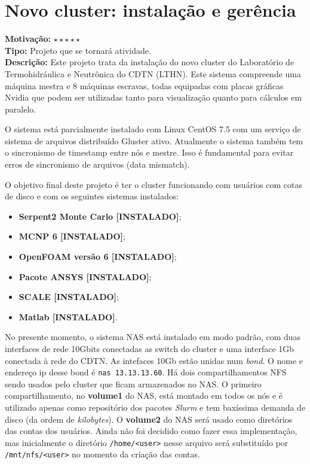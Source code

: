 \chapter{Novo cluster: instalação e gerência}
\label{chap:cluster}

\textbf{Motivação:} $\star\star\star\star\star$\\

\textbf{Tipo:} Projeto que se tornará atividade.\\

\textbf{Descrição:} Este projeto trata da instalação do novo cluster do Laboratório 
de Termohidráulica e Neutrônica do CDTN (LTHN). Este sistema compreende uma máquina mestra e 8 máquinas escravas, todas equipadas com placas gráficas Nvidia que podem ser utilizadas tanto para visualização quanto para cálculos em paralelo.

O sistema está parcialmente instalado com Linux CentOS 7.5 com um serviço de 
sistema de arquivos distribuído Gluster ativo. Atualmente o sistema também tem 
o sincronismo de timestamp entre nós e mestre. Isso é fundamental para evitar 
erros de sincronismo de arquivos (data mismatch).

O objetivo final deste projeto é ter o cluster funcionando com usuários com cotas 
de disco e com os seguintes sistemas instalados:

\begin{itemize}
	\item \textbf{Serpent2 Monte Carlo [INSTALADO]};
	\item \textbf{MCNP 6 [INSTALADO]};
	\item \textbf{OpenFOAM versão 6 [INSTALADO]};
	\item \textbf{Pacote ANSYS [INSTALADO]};
	\item \textbf{SCALE [INSTALADO]};
	\item \textbf{Matlab [INSTALADO]}.
\end{itemize}

No presente momento, o sistema NAS está instalado em modo padrão, com duas 
interfaces de rede 10Gbits conectadas as switch do cluster e uma interface 
1Gb conectada à rede do CDTN. As intefaces 10Gb estão unidas num \textit{bond}. 
O nome e endereço ip desse bond é \texttt{nas 13.13.13.60}. Há dois compartilhamentos 
NFS sendo usados pelo cluster que ficam armazenados no NAS. O primeiro compartilhamento, no \textbf{volume1} do NAS, está montado em todos os nós e é utilizado apenas como repositório dos pacotes 
\textit{Slurm} e tem baxíssima demanda de disco (da ordem de \textit{kilobytes}). 
O \textbf{volume2} do NAS será usado como diretórios das contas dos usuários.
Ainda não foi decidido como fazer essa implementação, mas inicialmente o diretório
\texttt{/home/<user>} nesse arquivo será substituído por \texttt{/mnt/nfs/<user>} 
no momento da criação das contas. 

